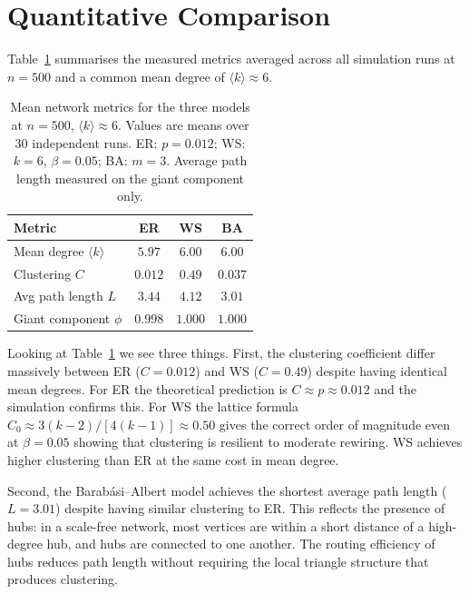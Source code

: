 \documentclass[12pt, a4paper]{report}
\theoremstyle{definition}
\theoremstyle{plain}
\theoremstyle{remark}
\begin{document}
\section{Quantitative Comparison}
\label{sec:comparison_quantitative}

Table~\ref{tab:comparison} summarises the measured metrics
averaged across all simulation runs at $n = 500$ and a common
mean degree of $\langle k \rangle \approx 6$.

\begin{table}[H]
  \centering
  \caption{Mean network metrics for the three models at
    $n=500$, $\langle k \rangle \approx 6$. Values are means
    over 30 independent runs. ER: $p = 0.012$; WS: $k=6$,
    $\beta = 0.05$; BA: $m=3$. Average path length measured
    on the giant component only.}
  \label{tab:comparison}
  \begin{tabular}{lccc}
    \toprule
    Metric & ER & WS & BA \\
    \midrule
    Mean degree $\langle k \rangle$ & $5.97$ & $6.00$ & $6.00$ \\
    Clustering $C$    & $0.012$ & $0.49$ & $0.037$ \\
    Avg path length $L$ & $3.44$ & $4.12$ & $3.01$ \\
    Giant component $\phi$ & $0.998$ & $1.000$ & $1.000$ \\
    \bottomrule
  \end{tabular}
\end{table}

Looking at Table~\ref{tab:comparison} we see three things.
First, the clustering coefficient differ massively between ER
($C = 0.012$) and WS
($C = 0.49$) despite having identical mean degrees. For ER the
theoretical prediction is $C \approx p \approx 0.012$ and the
simulation confirms this. For WS the lattice
formula $C_0 \approx 3(k-2)/[4(k-1)] \approx 0.50$ gives the
correct order of magnitude even at $\beta = 0.05$ showing
that clustering is resilient to moderate rewiring. WS achieves
higher clustering than ER at the same cost in mean degree.

Second, the Barabási--Albert model achieves the shortest
average path length ($L = 3.01$) despite having similar clustering
to ER. This reflects the presence of hubs: in a
scale-free network, most vertices are within a short distance
of a high-degree hub, and hubs are connected to one another.
The routing efficiency of hubs reduces path length without
requiring the local triangle structure that produces
clustering.
\end{document}
